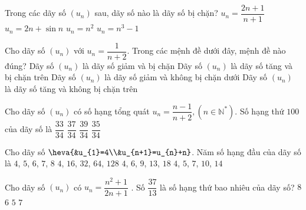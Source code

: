 \begin{ex}%
	Trong các dãy số $(u_{n})$ sau, dãy số nào là dãy số bị chặn?
	\choice
	{\True $u_{n}=\dfrac{2n+1}{n+1}$}
	{$u_{n} =2n+\sin n$}
	{$u_{n} =n^{2} $}
	{$u_{n} =n^{3} -1$}
\end{ex}

\begin{ex}%
	Cho dãy số $(u_{n})$ với $u_{n} =\dfrac{1}{n+2}$. Trong các mệnh đề dưới đây, mệnh đề nào đúng?
	\choice
	{\True Dãy số $(u_{n})$ là dãy số giảm và bị chặn}
	{Dãy số $(u_{n})$ là dãy số tăng và bị chặn trên}
	{Dãy số $(u_{n})$ là dãy số giảm và không bị chặn dưới}
	{Dãy số $(u_{n})$ là dãy số tăng và không bị chặn trên}
\end{ex}

\begin{ex}%
	Cho dãy số $(u_{n})$ có số hạng tổng quát $u_{n} =\dfrac{n-1}{n+2},\left(n\in \mathbb{N}^{*} \right)$. Số hạng thứ $100$ của dãy số là
	\choice
	{\True $\dfrac{33}{34}$}
	{$\dfrac{37}{34}$}
	{$\dfrac{39}{34}$}
	{$\dfrac{35}{34}$}
\end{ex}

\begin{ex}%
	Cho dãy số $\heva{&u_{1}=4\\&u_{n+1}=u_{n}+n}$. Năm số hạng đầu của dãy số là
	\choice
	{$4$, $5$, $6$, $7$, $8$}
	{$4$, $16$, $32$, $64$, $128$}
	{$4$, $6$, $9$, $13$, $18$}
	{\True $4$, $5$, $7$, $10$, $14$}
\end{ex}

\begin{ex}%
	Cho dãy số $(u_{n})$ có $u_{n} =\dfrac{n^{2} +1}{2n+1} $ . Số $\dfrac{37}{13}$ là số hạng thứ bao nhiêu của dãy số?
	\choice
	{$8$}
	{\True $6$}
	{$5$}
	{$7$}
\end{ex}


